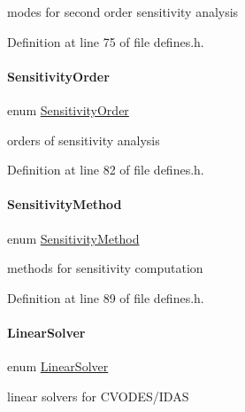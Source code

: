 modes for second order sensitivity analysis 

Definition at line 75 of file defines.\+h.

\mbox{\label{namespaceamici_aaa03ec2f8c4d5323b98d71134a462fda}} 
\paragraph{\texorpdfstring{SensitivityOrder}{SensitivityOrder}}
{\footnotesize\ttfamily enum \mbox{\hyperlink{namespaceamici_aaa03ec2f8c4d5323b98d71134a462fda}{Sensitivity\+Order}}\hspace{0.3cm}{\ttfamily [strong]}}

orders of sensitivity analysis 

Definition at line 82 of file defines.\+h.

\mbox{\label{namespaceamici_aa0fa493529f6872e7e776b91fbbf38f9}} 
\paragraph{\texorpdfstring{SensitivityMethod}{SensitivityMethod}}
{\footnotesize\ttfamily enum \mbox{\hyperlink{namespaceamici_aa0fa493529f6872e7e776b91fbbf38f9}{Sensitivity\+Method}}\hspace{0.3cm}{\ttfamily [strong]}}

methods for sensitivity computation 

Definition at line 89 of file defines.\+h.

\mbox{\label{namespaceamici_a1a6a4776314a0843143e5631c3ce21a7}} 
\paragraph{\texorpdfstring{LinearSolver}{LinearSolver}}
{\footnotesize\ttfamily enum \mbox{\hyperlink{namespaceamici_a1a6a4776314a0843143e5631c3ce21a7}{Linear\+Solver}}\hspace{0.3cm}{\ttfamily [strong]}}

linear solvers for C\+V\+O\+D\+E\+S/\+I\+D\+AS 

